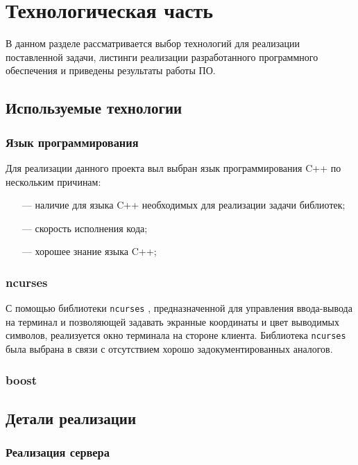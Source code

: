 \chapter{Технологическая часть}

В данном разделе рассматривается выбор технологий для реализации поставленной задачи, листинги реализации разработанного программного обеспечения и приведены результаты работы ПО.

\section{Используемые технологии}

\subsection{Язык программирования}

Для реализации данного проекта выл выбран язык программирования C++ \cite{c++} по нескольким причинам:

\begin{itemize}
	\item[---] наличие для языка C++ необходимых для реализации задачи библиотек;
	\item[---] скорость исполнения кода;
	\item[---] хорошее знание языка C++;
\end{itemize}

\subsection{ncurses}

С помощью библиотеки \texttt{ncurses} \cite{ncurses}, предназначенной для управления ввода-вывода на терминал и позволяющей задавать экранные координаты и цвет выводимых символов, реализуется окно терминала на стороне клиента. Библиотека \texttt{ncurses} была выбрана в связи с отсутствием хорошо задокументированных аналогов.

\subsection{boost}

\section{Детали реализации}

\subsection{Реализация сервера}

